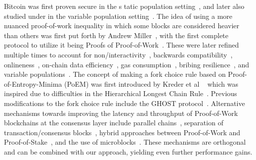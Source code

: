 \noindent
{}
Bitcoin was first proven secure in the s
tatic population setting~\cite{backbone},
and later also studied under in the variable population setting~\cite{varbackbone}.
The idea of using a more nuanced proof-of-work inequality in which some blocks
are considered heavier than others was first put forth by Andrew Miller~\cite{highway},
with the first complete protocol to utilize it being
Proofs of Proof-of-Work~\cite{popow}. These were later refined multiple times
to account for non\-/interactivity~\cite{nipopows}, backwards compatibility~\cite{velvet-nipopows},
onlineness~\cite{logspace}, on-chain data efficiency~\cite{compact-superblocks},
gas consumption~\cite{gasefficient-nipopows},
bribing resilience~\cite{soft-power},
and variable populations~\cite{dionyziz}. The concept of making a fork choice rule
based on Proof-of-Entropy-Minima (PoEM) was first introduced by Kreder et al ~\cite{poem}
which was inspired due to difficulties in the Hierarchical Longest Chain Rule~\cite{hlcr}.
Previous modifications to the fork choice rule include the GHOST
protocol~\cite{ghost}. Alternative mechanisms towards improving the latency and throughput
of Proof-of-Work blockchains at the consensus layer include parallel chains~\cite{parallel-chains},
separation of transaction/consensus blocks~\cite{prism}, hybrid approaches between Proof-of-Work and Proof-of-Stake~\cite{byzcoin},
and the use of microblocks~\cite{bitcoin-ng}. These mechanisms are orthogonal and can be combined with our approach, yielding even
further performance gains.
